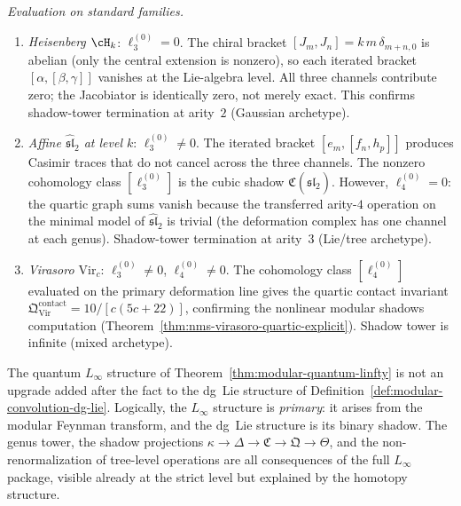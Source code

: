 \begin{construction}
\emph{Evaluation on standard families.}
\begin{enumerate}[label=\textup{(\alph*)}]
\item \emph{Heisenberg $\cH_k$}: $\ell_3^{(0)} = 0$.
  The chiral bracket $[J_m, J_n] = k\,m\,\delta_{m+n,0}$ is
  abelian (only the central extension is nonzero), so each
  iterated bracket $[\alpha, [\beta, \gamma]]$ vanishes at the
  Lie-algebra level.  All three channels contribute zero; the
  Jacobiator is identically zero, not merely exact.  This confirms
  shadow-tower termination at arity~$2$ (Gaussian archetype).
\item \emph{Affine $\widehat{\mathfrak{sl}}_2$ at level $k$}:
  $\ell_3^{(0)} \neq 0$.
  The iterated bracket $[e_m, [f_n, h_p]]$ produces Casimir traces
  that do not cancel across the three channels.  The nonzero
  cohomology class $[\ell_3^{(0)}]$ is the cubic shadow
  $\mathfrak{C}(\widehat{\mathfrak{sl}}_2)$.
  However, $\ell_4^{(0)} = 0$: the quartic graph sums vanish
  because the transferred arity-$4$ operation on the minimal model
  of $\widehat{\mathfrak{sl}}_2$ is trivial (the deformation
  complex has one channel at each genus).  Shadow-tower termination
  at arity~$3$ (Lie/tree archetype).
\item \emph{Virasoro $\mathrm{Vir}_c$}: $\ell_3^{(0)} \neq 0$,
  $\ell_4^{(0)} \neq 0$.  The cohomology class
  $[\ell_4^{(0)}]$ evaluated on the primary deformation line gives
  the quartic contact invariant
  $\mathfrak{Q}^{\mathrm{contact}}_{\mathrm{Vir}}
  = 10/[c(5c+22)]$, confirming the nonlinear modular shadows
  computation
  (Theorem~\ref{thm:nms-virasoro-quartic-explicit}).
  Shadow tower is infinite (mixed archetype).
\end{enumerate}
\end{construction}

\begin{remark}
\label{rem:linfty-logical-priority}
The quantum $L_\infty$ structure of
Theorem~\ref{thm:modular-quantum-linfty} is not an upgrade added
after the fact to the dg~Lie structure of
Definition~\ref{def:modular-convolution-dg-lie}.  Logically, the
$L_\infty$ structure is \emph{primary}: it arises from the modular
Feynman transform, and the dg~Lie structure is its binary shadow.
The genus tower, the shadow projections
$\kappa \to \Delta \to \mathfrak{C} \to \mathfrak{Q} \to \Theta$,
and the non-renormalization of tree-level operations are all
consequences of the full $L_\infty$ package, visible already at the
strict level but explained by the homotopy structure.
\end{remark}

